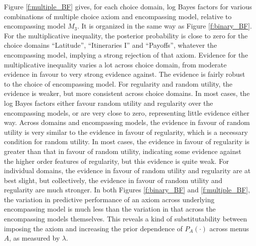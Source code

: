 \documentclass[11pt,letter]{article}
\newcommand{\menus}{menus}
\begin{document}
Figure \ref{f:multiple_BF} gives, for each choice domain, log Bayes factors for various combinations of multiple choice axiom and encompassing model, relative to encompassing model $M_3$.
It is organized in the same way as Figure \ref{f:binary_BF}.
For the multiplicative inequality, the posterior probability is close to zero for the choice domains ``Latitude'', ``Itineraries I'' and ``Payoffs'', whatever the encompassing model, implying a strong rejection of that axiom.
Evidence for the multiplicative inequality varies a lot across choice domain, from moderate evidence in favour to very strong evidence against.
The evidence is fairly robust to the choice of encompassing model.
For regularity and random utility, the evidence is weaker, but more consistent across choice domains.
In most cases, the log Bayes factors either favour random utility and regularity over the encompassing models, or are very close to zero, representing little evidence either way.
Across domains and encompassing models, the evidence in favour of random utility is very similar to the evidence in favour of regularity, which is a necessary condition for random utility.
In most cases, the evidence in favour of regularity is greater than that in favour of random utility, indicating some evidence against the higher order features of regularity, but this evidence is quite weak.
For individual domains, the evidence in favour of random utility and regularity are at best slight, but collectively, the evidence in favour of random utility and regularity are much stronger.
In both Figures \ref{f:binary_BF} and \ref{f:multiple_BF}, the variation in predictive performance of an axiom across underlying encompassing model is much less than the variation in that across the encompassing models themselves.
This reveals a kind of substitutability between imposing the axiom and increasing the prior dependence of $P_A(\cdot)$ across \menus{} $A$, as measured by $\lambda$.
\end{document}
